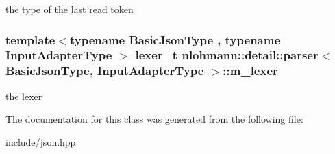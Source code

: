 the type of the last read token 

\subsubsection[{\texorpdfstring{m\+\_\+lexer}{m_lexer}}]{\setlength{\rightskip}{0pt plus 5cm}template$<$typename Basic\+Json\+Type , typename Input\+Adapter\+Type $>$ {\bf lexer\+\_\+t} {\bf nlohmann\+::detail\+::parser}$<$ Basic\+Json\+Type, Input\+Adapter\+Type $>$\+::m\+\_\+lexer\hspace{0.3cm}{\ttfamily [private]}}\hypertarget{classnlohmann_1_1detail_1_1parser_a01a73810f794c239aaf123aa2af7371d}{}\label{classnlohmann_1_1detail_1_1parser_a01a73810f794c239aaf123aa2af7371d}


the lexer 



The documentation for this class was generated from the following file\+:\begin{DoxyCompactItemize}
\item 
include/\hyperlink{json_8hpp}{json.\+hpp}\end{DoxyCompactItemize}
